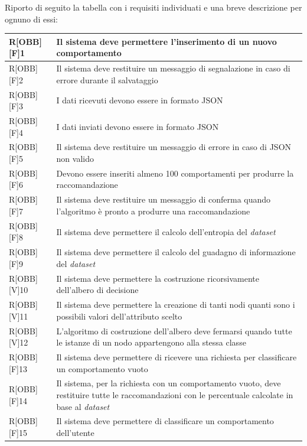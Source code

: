 \newpage
Riporto di seguito la tabella con i requisiti individuati e una breve descrizione per ognuno di essi:
\begin{table}[h]
	\begin{tabular}{|p{}|p{}|}
		\midrule
		R[OBB][F]1 & Il sistema deve permettere l'inserimento di un nuovo comportamento \\ \midrule
		R[OBB][F]2 & Il sistema deve restituire un messaggio di segnalazione in caso di errore durante il salvataggio \\ \midrule
		R[OBB][F]3 & I dati ricevuti devono essere in formato \gls{JSON} \\ \midrule
		R[OBB][F]4 & I dati inviati devono essere in formato \gls{JSON} \\ \midrule
		R[OBB][F]5 & Il sistema deve restituire un messaggio di errore in caso di \gls{JSON} non valido \\ \midrule
		R[OBB][F]6 & Devono essere inseriti almeno 100 comportamenti per produrre la raccomandazione \\ \midrule
		R[OBB][F]7 & Il sistema deve restituire un messaggio di conferma quando l'algoritmo è pronto a produrre una raccomandazione \\ \midrule
		R[OBB][F]8 & Il sistema deve permettere il calcolo dell'entropia del \textit{dataset} \\ \midrule
		R[OBB][F]9 & Il sistema deve permettere il calcolo del guadagno di informazione del \textit{dataset} \\ \midrule
		R[OBB][V]10 & Il sistema deve permettere la costruzione ricorsivamente dell'albero di decisione \\ \midrule
		R[OBB][V]11 & Il sistema deve permettere la creazione di tanti nodi quanti sono i possibili valori dell'attributo scelto \\ \midrule
		R[OBB][V]12 & L'algoritmo di costruzione dell'albero deve fermarsi quando tutte le istanze di un nodo appartengono alla stessa classe \\ \midrule	
		R[OBB][F]13 & Il sistema deve permettere di ricevere una richiesta per classificare un comportamento vuoto \\ \midrule
		R[OBB][F]14 & Il sistema, per la richiesta con un comportamento vuoto, deve restituire tutte le raccomandazioni con le percentuale calcolate in base al \textit{dataset} \\ \midrule
		R[OBB][F]15 & Il sistema deve permettere di classificare un comportamento dell'utente \\ \midrule
		\bottomrule
		
	\end{tabular}
\end{table}
		
